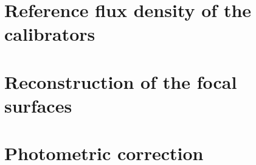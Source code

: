 \documentclass[traditionalabstract]{aa}
\begin{document}
%
%

\begin{appendix}
  \section{Reference flux density of the calibrators}
  \label{ap:ref_flux_calibrator}
  
  
  \section{Reconstruction of the focal surfaces}
  \label{ap:focus_surfaces}
  

  \section{Photometric correction}
  \label{se:photometric_correction}
  
\end{appendix}

%
\end{document}
